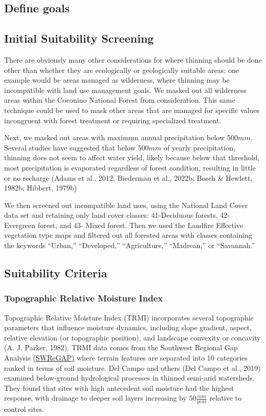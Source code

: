 \documentclass[
]{agujournal2019}
\begin{document}
\subsection{Define goals}\label{define-goals}

\subsection{Initial Suitability
Screening}\label{initial-suitability-screening}

There are obviously many other considerations for where thinning should
be done other than whether they are ecologically or geologically
suitable areas; one example would be areas managed as wilderness, where
thinning may be incompatible with land use management goals. We masked
out all wilderness areas within the Coconino National Forest from
consideration. This same technique could be used to mask other areas
that are managed for specific values incongruent with forest treatment
or requiring specialized treatment.

Next, we masked out areas with maximum annual precipitation below
500\(mm\). Several studies have suggested that below 500\(mm\) of yearly
precipitation, thinning does not seem to affect water yield, likely
because below that threshold, most precipitation is evaporated
regardless of forest condition, resulting in little or no recharge
(Adams et al., 2012; Biederman et al., 2022b; Bosch \& Hewlett, 1982b;
Hibbert, 1979b)

We then screened out incompatible land uses, using the National Land
Cover data set and retaining only land cover classes: 41-Deciduous
forests, 42- Evergreen forest, and 43- Mixed forest. Then we used the
Landfire Effective vegetation type maps and filtered out all forested
areas with classes containing the keywords ``Urban,'' ``Developed,''
``Agriculture,'' ``Madrean,'' or ``Savannah.''

\subsection{Suitability Criteria}\label{suitability-criteria}

\subsubsection{Topographic Relative Moisture
Index}\label{topographic-relative-moisture-index}

Topographic Relative Moisture Index (TRMI) incorporates several
topographic parameters that influence moisture dynamics, including slope
gradient, aspect, relative elevation (or topographic position), and
landscape convexity or concavity (A. J. Parker, 1982). TRMI data comes
from the Southwest Regional Gap Analysis
\href{https://swregap.org/data/}{(SWReGAP)} where terrain features are
separated into 10 categories ranked in terms of soil moisture. Del Campo
and others (Del Campo et al., 2019) examined below-ground hydrological
processes in thinned semi-arid watersheds. They found that sites with
high antecedent soil moisture had the highest response, with drainage to
deeper soil layers increasing by \(50\frac{mm}{year}\) relative to
control sites.
\end{document}

